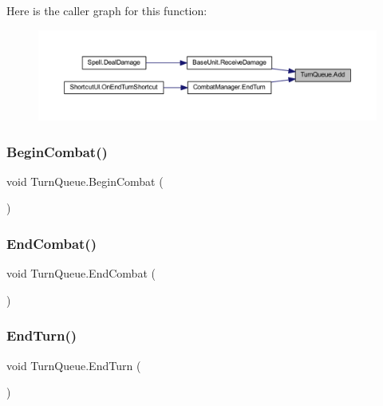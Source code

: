 Here is the caller graph for this function\+:
\nopagebreak
\begin{figure}[H]
\begin{center}
\leavevmode
\includegraphics[width=350pt]{class_turn_queue_aa677cc3ae9812e45a5b7e8932c199e27_icgraph}
\end{center}
\end{figure}
\mbox{\label{class_turn_queue_a7de50ac6b689f76c71d808962b6d1b86}} 
\subsubsection{\texorpdfstring{BeginCombat()}{BeginCombat()}}
{\footnotesize\ttfamily void Turn\+Queue.\+Begin\+Combat (\begin{DoxyParamCaption}{ }\end{DoxyParamCaption})}

\mbox{\label{class_turn_queue_a9b3696b9a7672bbb8a79e3f0dc3ef393}} 
\subsubsection{\texorpdfstring{EndCombat()}{EndCombat()}}
{\footnotesize\ttfamily void Turn\+Queue.\+End\+Combat (\begin{DoxyParamCaption}{ }\end{DoxyParamCaption})}

\mbox{\label{class_turn_queue_aadfdf0f72201cdc985ad2dbb9520eaee}} 
\subsubsection{\texorpdfstring{EndTurn()}{EndTurn()}}
{\footnotesize\ttfamily void Turn\+Queue.\+End\+Turn (\begin{DoxyParamCaption}{ }\end{DoxyParamCaption})}

